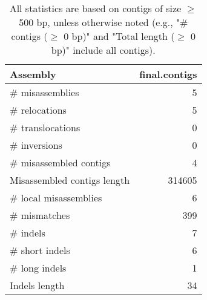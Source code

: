 \documentclass[12pt,a4paper]{article}
\begin{document}
\begin{table}[ht]
\begin{center}
\caption{All statistics are based on contigs of size $\geq$ 500 bp, unless otherwise noted (e.g., "\# contigs ($\geq$ 0 bp)" and "Total length ($\geq$ 0 bp)" include all contigs).}
\begin{tabular}{|l*{1}{|r}|}
\hline
Assembly & final.contigs \\ \hline
\# misassemblies & 5 \\ \hline
\hspace{5mm}\# relocations & 5 \\ \hline
\hspace{5mm}\# translocations & 0 \\ \hline
\hspace{5mm}\# inversions & 0 \\ \hline
\# misassembled contigs & 4 \\ \hline
Misassembled contigs length & 314605 \\ \hline
\# local misassemblies & 6 \\ \hline
\# mismatches & 399 \\ \hline
\# indels & 7 \\ \hline
\hspace{5mm}\# short indels & 6 \\ \hline
\hspace{5mm}\# long indels & 1 \\ \hline
Indels length & 34 \\ \hline
\end{tabular}
\end{center}
\end{table}
\end{document}
